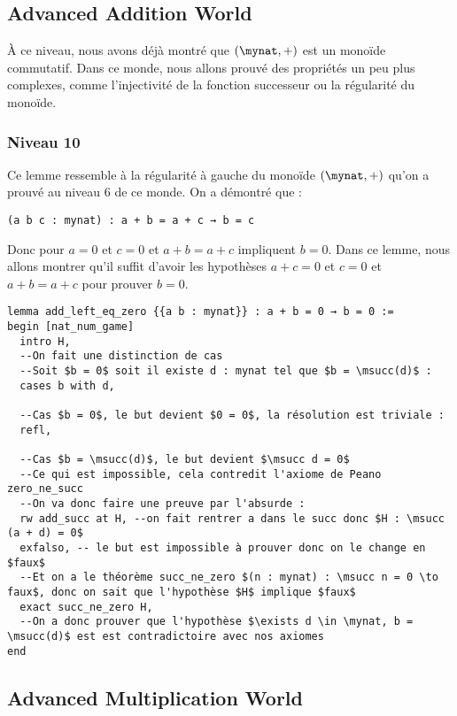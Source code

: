 \subsection{Advanced Addition World}

À ce niveau, nous avons déjà montré que $(\mynat , +)$ est un monoïde commutatif.
Dans ce monde, nous allons prouvé des propriétés un peu plus complexes, comme l'injectivité de la fonction successeur ou la régularité du monoïde.

\subsubsection{Niveau 10}

Ce lemme ressemble à la régularité à gauche du monoïde $(\mynat, +)$ qu'on a prouvé au niveau 6 de ce monde.
On a démontré que :
\begin{verbatim}
(a b c : mynat) : a + b = a + c → b = c
\end{verbatim}
Donc pour $a = 0$ et $c = 0$ et $a + b = a + c$ impliquent $b = 0$.
Dans ce lemme, nous allons montrer qu'il suffit d'avoir les hypothèses $a+c = 0$ et $c = 0$ et $a + b = a + c$ pour prouver $b = 0$.

\begin{verbatim}
lemma add_left_eq_zero {{a b : mynat}} : a + b = 0 → b = 0 :=
begin [nat_num_game]
  intro H,
  --On fait une distinction de cas
  --Soit $b = 0$ soit il existe d : mynat tel que $b = \msucc(d)$ :
  cases b with d,

  --Cas $b = 0$, le but devient $0 = 0$, la résolution est triviale :
  refl,

  --Cas $b = \msucc(d)$, le but devient $\msucc d = 0$
  --Ce qui est impossible, cela contredit l'axiome de Peano zero_ne_succ
  --On va donc faire une preuve par l'absurde :
  rw add_succ at H, --on fait rentrer a dans le succ donc $H : \msucc (a + d) = 0$
  exfalso, -- le but est impossible à prouver donc on le change en $faux$
  --Et on a le théorème succ_ne_zero $(n : mynat) : \msucc n = 0 \to faux$, donc on sait que l'hypothèse $H$ implique $faux$
  exact succ_ne_zero H,
  --On a donc prouver que l'hypothèse $\exists d \in \mynat, b = \msucc(d)$ est est contradictoire avec nos axiomes
end
\end{verbatim}

\subsection{Advanced Multiplication World}

